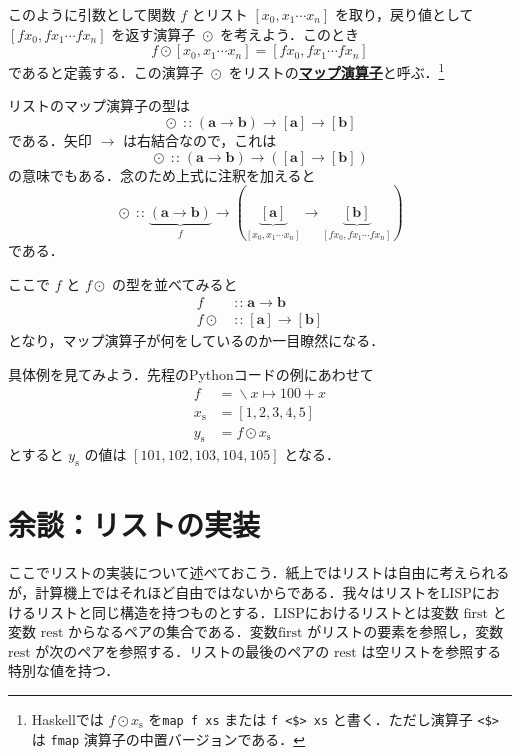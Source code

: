 \documentclass[a5paper,twoside,fleqn,draft]{jsbook}
\newcommand{\TK}[1]{\mask{\textbf{TK:}~#1}{C}}
\newcommand{\programminglanguage}[1]{\textsf{#1}}
\newcommand{\haskell}{\programminglanguage{Haskell}}
\newcommand{\lisp}{\programminglanguage{LISP}}
\newcommand{\python}{\programminglanguage{Python}}
\newcommand{\keyword}[1]{{\underline{\textbf{#1}}}}
\newcommand{\code}[1]{\texttt{#1}}
\newcommand{\mSpecialVar}[1]{\textrm{#1}}
\newcommand{\mFirstVar}{\mSpecialVar{first}}
\newcommand{\mRestVar}{\mSpecialVar{rest}}
\DeclareMathOperator{\mFuncArrow}{\rightarrow}
\DeclareMathOperator{\mIn}{{:\!:}}
\DeclareMathOperator{\mLambda}{\backslash}
\DeclareMathOperator{\mLambdaArrow}{\mapsto}
\DeclareMathOperator{\mMapList}{\odot}
\newcommand{\mType}[1]{\mathbf{#1}} %
\newcommand{\mA}{\mType{a}}
\newcommand{\mB}{\mType{b}}
\newcommand{\mList}[1]{{#1}_\mathrm{s}}
\begin{document}
このように引数として関数 $f$ とリスト $[x_0,x_1\dotsb x_n]$ を取り，戻り値として $[fx_0,fx_1\dotsb fx_n]$ を返す演算子 $\mMapList$ を考えよう．このとき
\begin{equation}
  f\mMapList[x_0,x_1\dotsb x_n]
  =[fx_0,fx_1\dotsb fx_n]
\end{equation}
であると定義する．この演算子 $\mMapList$ をリストの\keyword{マップ演算子}と呼ぶ．\footnote{\haskell では $f\mMapList\mList{x}$ を\code{map f xs} または \code{f <\$> xs} と書く．ただし演算子 \code{<\$>} は \code{fmap} 演算子の中置バージョンである．}

リストのマップ演算子の型は
\begin{equation}
  \mMapList
  \mIn{}(\mA\mFuncArrow\mB)\mFuncArrow[\mA]\mFuncArrow[\mB]
\end{equation}
である．矢印 $\mFuncArrow$ は右結合なので，これは
\begin{equation}
  \mMapList
  \mIn{}(\mA\mFuncArrow\mB)\mFuncArrow([\mA]\mFuncArrow[\mB])
\end{equation}
の意味でもある．念のため上式に注釈を加えると
\begin{equation}
  \mMapList
  \mIn\underbrace{\left(\mA\mFuncArrow\mB\right)}_f
  \mFuncArrow\left(\underbrace{[\mA]}_{[x_0,x_1\dotsb x_n]}
  \mFuncArrow\underbrace{[\mB]}_{[fx_0,fx_1\dotsb fx_n]}\right)
\end{equation}
である．

ここで $f$ と $f\mMapList$ の型を並べてみると
\begin{align}
  f
  &\mIn\mA\mFuncArrow\mB\\
  f\mMapList
  &\mIn{}[\mA]\mFuncArrow[\mB]
\end{align}
となり，マップ演算子が何をしているのか一目瞭然になる．

\TK{liftM}

具体例を見てみよう．先程の\python コードの例にあわせて
\begin{align}
  f
  &=\mLambda x\mLambdaArrow100+x\\
  \mList{x}
  &=[1,2,3,4,5]\\
  \mList{y}
  &=f\mMapList\mList{x}
\end{align}
とすると $\mList{y}$ の値は $[101,102,103,104,105]$ となる．

\section{余談：リストの実装}

ここでリストの実装について述べておこう．紙上ではリストは自由に考えられるが，計算機上ではそれほど自由ではないからである．我々はリストを\lisp におけるリストと同じ構造を持つものとする．\lisp におけるリストとは変数 $\mFirstVar$ と変数 $\mRestVar$ からなるペアの集合である．変数$\mFirstVar$ がリストの要素を参照し，変数 $\mRestVar$ が次のペアを参照する．リストの最後のペアの $\mRestVar$ は空リストを参照する特別な値を持つ．
\end{document}
